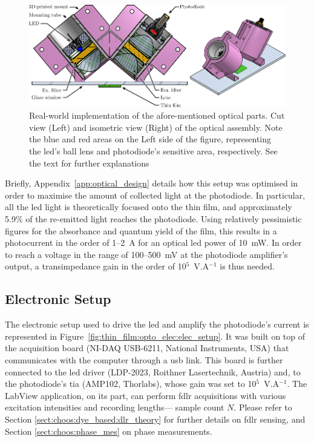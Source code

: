 \begin{figure}
	\includegraphics{1_main_matter/thin_film_figures/optoelectronics/optics_cut.pdf}
	\caption[Real-world implementation of the afore-mentioned optical parts.]{Real-world implementation of the afore-mentioned optical parts. Cut view (Left) and isometric view (Right) of the optical assembly. Note the blue and red areas on the Left side of the figure, representing the \gls{led}'s ball lens and photodiode's sensitive area, respectively. See the text for further explanations}
	\label{fig:thin_film:opto_elec:optics_cut}
\end{figure}

Briefly, Appendix~\ref{app:optical_design} details how this setup was optimised in order to maximise the amount of collected light at the photodiode. In particular, all the \gls{led} light is theoretically focused onto the thin film, and approximately 5.9\% of the re-emitted light reaches the photodiode. Using relatively pessimistic figures for the absorbance and quantum yield of the film, this results in a photocurrent in the order of 1--2~{\textmu}A for an optical \gls{led} power of 10~mW. In order to reach a voltage in the range of 100--500~mV at the photodiode amplifier's output, a transimpedance gain in the order of 10$^5$~V.A$^{-1}$ is thus needed.

\subsection{Electronic Setup}

The electronic setup used to drive the \gls{led} and amplify the photodiode's current is represented in Figure~\ref{fig:thin_film:opto_elec:elec_setup}. It was built on top of the acquisition board (NI-DAQ USB-6211, National Instruments, USA) that communicates with the computer through a \gls{usb} link. This board is further connected to the \gls{led} driver (LDP-2023, Roithner Lasertechnik, Austria) and, to the photodiode's \gls{tia} (AMP102, Thorlabs), whose gain was set to 10$^5$~V.A$^{-1}$. The LabView application, on its part, can perform \gls{fdlr} acquisitions with various excitation intensities and recording lengths---\ie{} sample count $N$. Please refer to Section \ref{sect:choos:dye_based:dlr_theory} for further details on \gls{fdlr} sensing, and Section \ref{sect:choos:phase_mes} on phase measurements.

